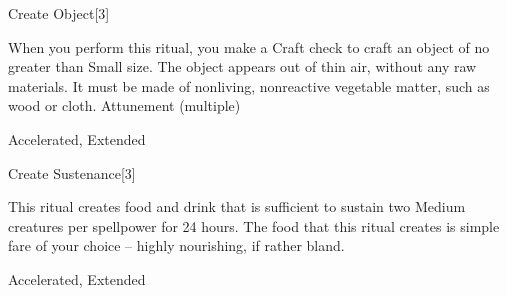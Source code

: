 \begin{spellsection}{Create Object}[3]
\begin{spellcontent}
\begin{spelltargetinginfo}
\spellrng{\rngclose}
\end{spelltargetinginfo}
\begin{spelleffects}
\spelleffect
When you perform this ritual, you make a Craft check to craft an object of no greater than Small size.
The object appears out of thin air, without any raw materials.
It must be made of nonliving, nonreactive vegetable matter, such as wood or cloth.
\spelldur Attunement (multiple)
\end{spelleffects}
\end{spellcontent}
\begin{spellfooter}
 Accelerated, Extended
\end{spellfooter}
\begin{spellsubcontent}
\end{spellsubcontent}
\end{spellsection}
\begin{spellsection}{Create Sustenance}[3]
\begin{spellcontent}
\begin{spelltargetinginfo}
\spellrng{\rngclose}
\end{spelltargetinginfo}
\begin{spelleffects}
\spelleffect
This ritual creates food and drink that is sufficient to sustain two Medium creatures per spellpower for 24 hours.
The food that this ritual creates is simple fare of your choice -- highly nourishing, if rather bland.
\end{spelleffects}
\end{spellcontent}
\begin{spellfooter}
 Accelerated, Extended
\end{spellfooter}
\begin{spellsubcontent}
\end{spellsubcontent}
\end{spellsection}

